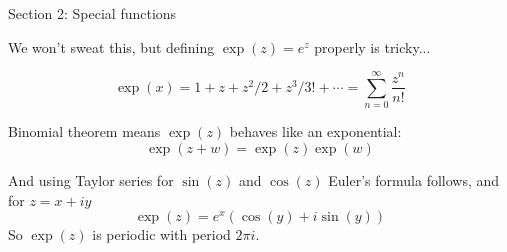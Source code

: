 \documentclass{beamer}
\begin{document}
    \begin{frame}[plain]
     \end{frame}




\begin{frame}{Section 2: Special functions}

We won't sweat this, but defining $\exp(z)=e^z$ properly is tricky...  

\begin{definition}
$$\exp(x)=1+z+z^2/2+z^3/3!+\cdots=\sum_{n=0}^\infty \frac{z^n}{n!}$$
\end{definition}
Binomial theorem means $\exp(z)$ behaves like an exponential: $$\exp(z+w)=\exp(z)\exp(w)$$

And using Taylor series for $\sin(z)$ and $\cos(z)$ Euler's formula follows, and for $z=x+iy$
$$\exp(z)=e^x\left(\cos(y)+i\sin(y)\right)$$
So $\exp(z)$ is periodic with period $2\pi i$.

\end{frame}
\end{document}
